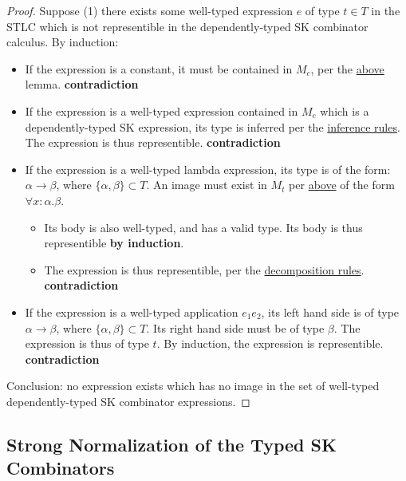 \documentclass[11pt]{article}
\begin{document}
\begin{proof}
Suppose (1) there exists some well-typed expression $e$ of type $t \in T$ in the STLC which is not representible in the dependently-typed SK combinator calculus. By induction: \\
\begin{itemize}
\item{If the expression is a constant, it must be contained in $M_{c}$, per the \href{maplemma:1}{above} lemma. \textbf{contradiction}} \\
\item{If the expression is a well-typed expression contained in $M_{c}$ which is a dependently-typed SK expression, its type is inferred per the \href{inference:1}{inference rules}. The expression is thus representible. \textbf{contradiction}} \\
\item If the expression is a well-typed lambda expression, its type is of the form: $\alpha \rightarrow \beta$, where $\{\alpha, \beta\} \subset T$. An image must exist in $M_{t}$ per \href{maplemma:1}{above} of the form $\forall x : \alpha.\beta$. \\
\begin{itemize}
  \item{Its body is also well-typed, and has a valid type. Its body is thus representible \textbf{by induction}.} \\
  \item{The expression is thus representible, per the \href{decomplemma:1}{decomposition rules}. \textbf{contradiction}} \\
\end{itemize}
\item{If the expression is a well-typed application $e_{1} e_{2}$, its left hand side is of type $\alpha \rightarrow \beta$, where $\{\alpha, \beta\} \subset T$. Its right hand side must be of type $\beta$. The expression is thus of type $t$. By induction, the expression is representible. \textbf{contradiction}} \\
\end{itemize}

Conclusion: no expression exists which has no image in the set of well-typed dependently-typed SK combinator expressions.
\end{proof}
\subsection{Strong Normalization of the Typed SK Combinators}
\label{sec:org3fd782d}
\end{document}
